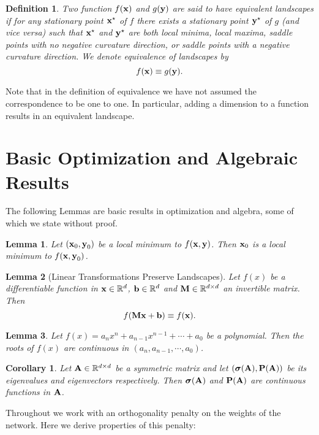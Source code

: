 \documentclass[11pt]{article}
\theoremstyle{plain}
\newtheorem{lemma}{Lemma}
\newtheorem{definition}{Definition}
\newtheorem{corollary}{Corollary}
\def\R{\mathbb{R}}
\theoremstyle{plain}
\numberwithin{equation}{section}
\numberwithin{lemma}{section}
\numberwithin{theorem}{section}
\numberwithin{corollary}{section}
\numberwithin{observation}{section}
\numberwithin{definition}{section}
\numberwithin{example}{section}
\begin{document}
\begin{definition} \label{def:equivalence} Two function $f(\V{x})$ and $g(\V{y})$ are said to have equivalent landscapes if for any stationary point $\V{x}^\star$ of $f$ there exists a stationary point $\V{y}^\star$ of $g$ (and vice versa) such that  $\V{x}^\star$ and $\V{y}^\star$ are both local minima, local maxima, saddle points with no negative curvature direction, or saddle points with a negative curvature direction. We denote equivalence of landscapes by
\[
f(\V{x}) \equiv g(\V{y}).
\]
\end{definition}
Note that in the definition of equivalence we have not assumed the correspondence to be one to one. In particular, adding a dimension to a function results in an equivalent landscape.

\section{Basic Optimization and Algebraic Results} \label{app:basic_opt}
The following Lemmas are basic results in optimization and algebra, some of which we state without proof.

{\begin{lemma} \label{lem:restriction}
Let $(\V{x}_0,\V{y}_0)$ be a local minimum to $f(\V{x},\V{y})$. Then $\V{x}_0$ is a local minimum to $f(\V{x},\V{y}_0)$.
\end{lemma}}


\begin{lemma} [Linear Transformations Preserve Landscapes] \label{lem:lin_transform} Let $f(x)$ be a differentiable function in $\V{x} \in \R^d$, $\V{b} \in \R^d$ and $\Mx{M} \in \R^{d \times d}$ an invertible matrix. Then
\[
f(\Mx{M}\V{x}+\V{b}) \equiv f(\V{x}).
\]
\end{lemma}




\begin{lemma} Let $f(x) = a_n x^n + a_{n-1}x^{n-1}+\cdots+a_0$ be a polynomial. Then the roots of $f(x)$ are continuous in $(a_n,a_{n-1},\cdots,a_0)$.
\end{lemma}
\begin{corollary} \label{cor:continuous_eig}
Let $\Mx{A} \in \R^{d \times d}$ be a symmetric matrix and let $(\V{\sigma}(\Mx{A}),\Mx{P}(\Mx{A}))$ be its eigenvalues and eigenvectors respectively. Then $\V{\sigma}(\Mx{A})$ and $\Mx{P}(\Mx{A})$ are continuous functions in $\Mx{A}$.
\end{corollary}

\noindent Throughout we work with an orthogonality penalty on the weights of the network.  Here we derive properties of this penalty:
\end{document}
